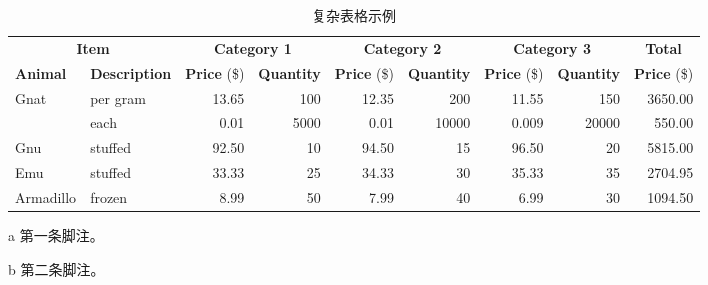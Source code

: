 \begin{table}[!htbp]
    \centering
    \begin{threeparttable}[b]
        \caption{复杂表格示例}
        \begin{tabular}{@{}llrrrrrrr@{}} \toprule
            \multicolumn{2}{c}{\textbf{Item}} & \multicolumn{2}{c}{\textbf{Category 1}} & \multicolumn{2}{c}{\textbf{Category 2}} & \multicolumn{2}{c}{\textbf{Category 3}} & \multicolumn{1}{c}{\textbf{Total}}                                                                                     \\ \cmidrule(r){1-2} \cmidrule(lr){3-4} \cmidrule(lr){5-6} \cmidrule(lr){7-8} \cmidrule(l){9-9}
            \textbf{Animal}                   & \textbf{Description}                    & \textbf{Price} (\$)                     & \textbf{Quantity}                       & \textbf{Price} (\$)                & \textbf{Quantity} & \textbf{Price} (\$) & \textbf{Quantity} & \textbf{Price} (\$) \\ \midrule
            Gnat                              & per gram\tnote{a}                       & 13.65                                   & 100                                     & 12.35                              & 200               & 11.55               & 150               & 3650.00             \\
                                              & each                                    & 0.01                                    & 5000                                    & 0.01                               & 10000             & 0.009               & 20000             & 550.00              \\
            Gnu                               & stuffed                                 & 92.50                                   & 10                                      & 94.50                              & 15                & 96.50               & 20                & 5815.00             \\
            Emu                               & stuffed                                 & 33.33                                   & 25                                      & 34.33                              & 30                & 35.33               & 35                & 2704.95             \\
            Armadillo                         & frozen                                  & 8.99                                    & 50                                      & 7.99                               & 40                & 6.99                & 30\tnote{b}       & 1094.50             \\ \bottomrule
        \end{tabular}
        \begin{tablenotes}
            \item [a] 第一条脚注。
            \item [b] 第二条脚注。
        \end{tablenotes}
    \end{threeparttable}
\end{table}

